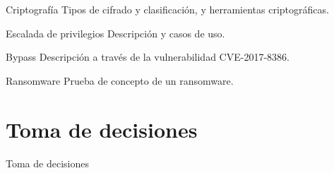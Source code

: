     \begin{frame}
        \begin{block}{Criptografía}
            Tipos de cifrado y clasificación, y herramientas criptográficas.
        \end{block}

        \begin{block}{Escalada de privilegios}
            Descripción y casos de uso.
        \end{block}

        \begin{block}{Bypass}
            Descripción a través de la vulnerabilidad CVE-2017-8386.
        \end{block}

        \begin{block}{Ransomware}
            Prueba de concepto de un ransomware.
        \end{block}
    \end{frame}
    

\section{Toma de decisiones}

    \begin{frame}
        \Huge{\centerline{Toma de decisiones}}
    \end{frame}

